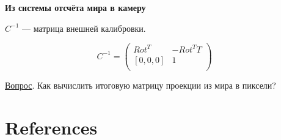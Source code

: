 \documentclass[addpoints]{exam}
\begin{document}
    {\bf Из системы отсчёта мира в камеру}
    
    $C^{-1}$ --- матрица внешней калибровки.
    
    \[
    C^{-1} = 
    \begin{pmatrix}
    	Rot^T & -Rot^T T\\
    	[0, 0, 0] & 1\\
    \end{pmatrix}\quad
    \]
    
    \underline{Вопрос}. Как вычислить итоговую матрицу проекции из мира в пиксели?

    
    \section{References}
    
\end{document}
